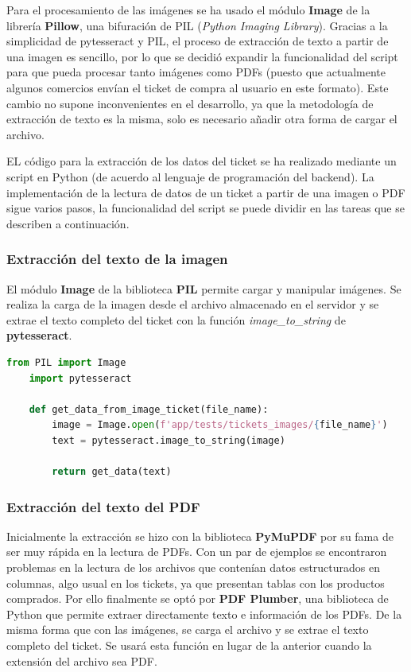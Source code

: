 Para el procesamiento de las imágenes se ha usado el módulo \textbf{Image} de la librería \textbf{Pillow}, una bifuración de PIL (\textit{Python Imaging Library})\cite{rodrigues202440}. Gracias a la simplicidad de pytesseract y PIL, el proceso de extracción de texto a partir de una imagen es sencillo, por lo que se decidió expandir la funcionalidad del script para que pueda procesar tanto imágenes como PDFs (puesto que actualmente algunos comercios envían el ticket de compra al usuario en este formato). Este cambio no supone inconvenientes en el desarrollo, ya que la metodología de extracción de texto es la misma, solo es necesario añadir otra forma de cargar el archivo.

EL código para la extracción de los datos del ticket se ha realizado mediante un script en Python (de acuerdo al lenguaje de programación del backend). La implementación de la lectura de datos de un ticket a partir de una imagen o PDF sigue varios pasos, la funcionalidad del script se puede dividir en las tareas que se describen a continuación.


\subsubsection{Extracción del texto de la imagen}
El módulo \textbf{Image} de la biblioteca \textbf{PIL} permite cargar y manipular imágenes. Se realiza la carga de la imagen desde el archivo almacenado en el servidor y se extrae el texto completo del ticket con la función \textit{image\_to\_string} de \textbf{pytesseract}.
    
\begin{lstlisting}[language=Python, caption=Extracción de texto de una imagen]
    from PIL import Image
    import pytesseract

    def get_data_from_image_ticket(file_name):
        image = Image.open(f'app/tests/tickets_images/{file_name}')
        text = pytesseract.image_to_string(image)

        return get_data(text)
\end{lstlisting}

\subsubsection{Extracción del texto del PDF}
Inicialmente la extracción se hizo con la biblioteca \textbf{PyMuPDF} por su fama de ser muy rápida en la lectura de PDFs. Con un par de ejemplos se encontraron problemas en la lectura de los archivos que contenían datos estructurados en columnas, algo usual en los tickets, ya que presentan tablas con los productos comprados. Por ello finalmente se optó por \textbf{PDF Plumber}, una biblioteca de Python que permite extraer directamente texto e información de los PDFs. De la misma forma que con las imágenes, se carga el archivo y se extrae el texto completo del ticket. Se usará esta función en lugar de la anterior cuando la extensión del archivo sea PDF.

